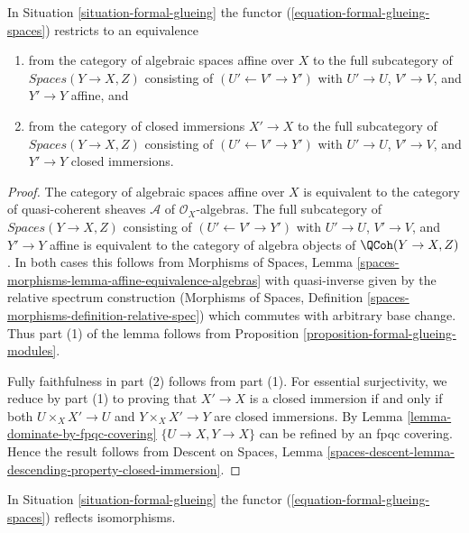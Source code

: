 \begin{lemma}
\label{lemma-equivalence-on-affine}
In Situation \ref{situation-formal-glueing} the functor
(\ref{equation-formal-glueing-spaces}) restricts to an
equivalence
\begin{enumerate}
\item from the category of algebraic spaces affine over $X$
to the full subcategory of $\textit{Spaces}(Y \to X, Z)$ consisting
of $(U' \leftarrow V' \rightarrow Y')$ with $U' \to U$, $V' \to V$,
and $Y' \to Y$ affine, and
\item from the category of closed immersions $X' \to X$
to the full subcategory of $\textit{Spaces}(Y \to X, Z)$ consisting
of $(U' \leftarrow V' \rightarrow Y')$ with $U' \to U$, $V' \to V$,
and $Y' \to Y$ closed immersions.
\end{enumerate}
\end{lemma}

\begin{proof}
The category of algebraic spaces affine over $X$ is equivalent to the
category of quasi-coherent sheaves $\mathcal{A}$ of $\mathcal{O}_X$-algebras.
The full subcategory of $\textit{Spaces}(Y \to X, Z)$ consisting of
$(U' \leftarrow V' \rightarrow Y')$ with $U' \to U$, $V' \to V$,
and $Y' \to Y$ affine is equivalent to the category of
algebra objects of $\QCoh(Y \to X, Z)$. In both cases this follows
from Morphisms of Spaces, Lemma
\ref{spaces-morphisms-lemma-affine-equivalence-algebras}
with quasi-inverse given by the relative spectrum construction
(Morphisms of Spaces, Definition
\ref{spaces-morphisms-definition-relative-spec})
which commutes with arbitrary base change. Thus part (1) of the
lemma follows from Proposition \ref{proposition-formal-glueing-modules}.

\medskip\noindent
Fully faithfulness in part (2) follows from part (1). For essential
surjectivity, we reduce by part (1) to proving that $X' \to X$
is a closed immersion if and only if both $U \times_X X' \to U$ and
$Y \times_X X' \to Y$ are closed immersions. By
Lemma \ref{lemma-dominate-by-fpqc-covering}
$\{U \to X, Y \to X\}$ can be refined by an fpqc covering.
Hence the result follows from
Descent on Spaces, Lemma
\ref{spaces-descent-lemma-descending-property-closed-immersion}.
\end{proof}

\begin{lemma}
\label{lemma-reflects-isomorphisms}
In Situation \ref{situation-formal-glueing} the functor
(\ref{equation-formal-glueing-spaces}) reflects isomorphisms.
\end{lemma}

